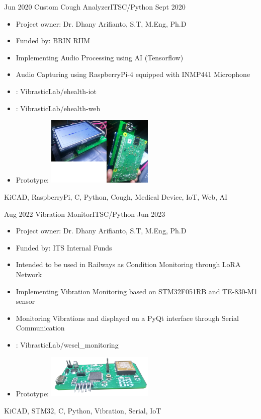 \begin{experiences}
    \emptySeparator
	\experience
    {Jun 2020} {Custom Cough Analyzer}{ITS}{C/Python}
	{Sept 2020} {
	\begin{itemize}
            \item Project owner: Dr. Dhany Arifianto, S.T, M.Eng, Ph.D
            \item Funded by: BRIN RIIM
	        \item Implementing Audio Processing using AI (Tensorflow)
	        \item Audio Capturing using RaspberryPi-4 equipped with INMP441 Microphone
	        \item \faGithub:  {VibrasticLab/ehealth-iot}
	        \item \faGithub:  {VibrasticLab/ehealth-web}
            \item Prototype: \includegraphics[width=0.4\textwidth]{images/cough.jpg}
	\end{itemize}
    }
    {KiCAD, RaspberryPi, C, Python, Cough, Medical Device, IoT, Web, AI}

    \emptySeparator
	\experience
    {Aug 2022} {Vibration Monitor}{ITS}{C/Python}
	{Jun 2023} {
	\begin{itemize}
            \item Project owner: Dr. Dhany Arifianto, S.T, M.Eng, Ph.D
            \item Funded by: ITS Internal Funds
            \item Intended to be used in Railways as Condition Monitoring through LoRA Network
	        \item Implementing Vibration Monitoring based on STM32F051RB and TE-830-M1 sensor
	        \item Monitoring Vibrations and displayed on a PyQt interface through Serial Communication
	    \item \faGithub:  {VibrasticLab/wesel\_monitoring}
        \item Prototype: \includegraphics[width=0.4\textwidth]{images/vibs_small.png}
	\end{itemize}
    }
    {KiCAD, STM32, C, Python, Vibration, Serial, IoT}


\end{experiences}
